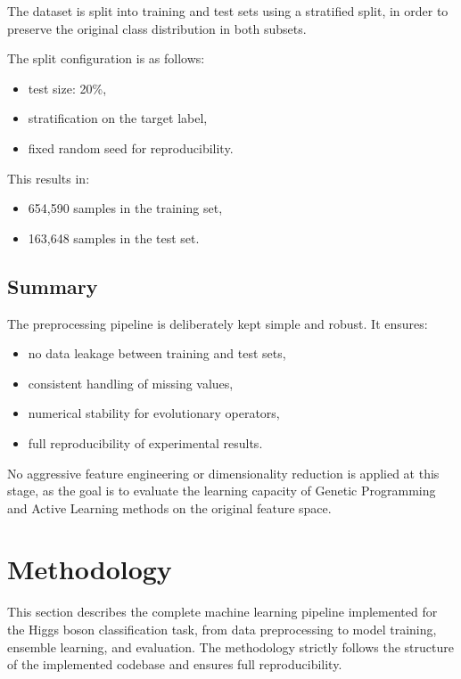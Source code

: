 \documentclass[12pt,a4paper]{article}
\begin{document}
The dataset is split into training and test sets using a stratified split, in
order to preserve the original class distribution in both subsets.

The split configuration is as follows:
\begin{itemize}
    \item test size: 20\%,
    \item stratification on the target label,
    \item fixed random seed for reproducibility.
\end{itemize}

This results in:
\begin{itemize}
    \item 654,590 samples in the training set,
    \item 163,648 samples in the test set.
\end{itemize}

\subsection{Summary}

The preprocessing pipeline is deliberately kept simple and robust. It ensures:
\begin{itemize}
    \item no data leakage between training and test sets,
    \item consistent handling of missing values,
    \item numerical stability for evolutionary operators,
    \item full reproducibility of experimental results.
\end{itemize}

No aggressive feature engineering or dimensionality reduction is applied at this
stage, as the goal is to evaluate the learning capacity of Genetic Programming
and Active Learning methods on the original feature space.

\section{Methodology}

This section describes the complete machine learning pipeline implemented for the Higgs boson classification task, from data preprocessing to model training, ensemble learning, and evaluation. The methodology strictly follows the structure of the implemented codebase and ensures full reproducibility.
\end{document}

